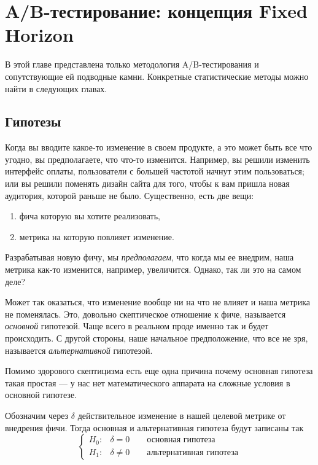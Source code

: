 \documentclass[../handbook.tex]{subfiles}
\begin{document}
\chapter{A\slash B-тестирование: концепция Fixed Horizon}

В этой главе представлена только методология A/B-тестирования и сопутствующие
ей подводные камни. Конкретные статистические методы можно найти в следующих
главах.

\section{Гипотезы}

Когда вы вводите какое-то изменение в своем продукте, а это может быть все что
угодно, вы предполагаете, что что-то изменится. Например, вы решили изменить
интерфейс оплаты, пользователи с большей частотой начнут этим пользоваться; или
вы решили поменять дизайн сайта для того, чтобы к вам пришла новая аудитория,
которой раньше не было. Существенно, есть две вещи:
\begin{enumerate}
    \item фича которую вы хотите реализовать,
    \item метрика на которую повлияет изменение.
\end{enumerate}
Разрабатывая новую фичу, мы \emph{предполагаем}, что когда мы ее внедрим, наша
метрика как-то изменится, например, увеличится. Однако, так ли это на самом
деле?

Может так оказаться, что изменение вообще ни на что не влияет и наша метрика не
поменялась. Это, довольно скептическое отношение к фиче, называется
\emph{основной} гипотезой. Чаще всего в реальном проде именно так и будет
происходить. С другой стороны, наше начальное предположение, что все не зря,
называется \emph{альтернативной} гипотезой.

Помимо здорового скептицизма есть еще одна причина почему основная гипотеза
такая простая --- у нас нет математического аппарата на сложные условия в
основной гипотезе.

Обозначим через $\delta$ действительное изменение в нашей целевой метрике от внедрения фичи. Тогда основная и альтернативная гипотеза будут записаны так
\begin{equation*}
    \begin{cases}
        H_0: & \delta = 0 \qquad\text{основная гипотеза}\\
        H_1: & \delta \ne 0 \qquad\text{альтернативная гипотеза}
    \end{cases}
\end{equation*}
\end{document}
